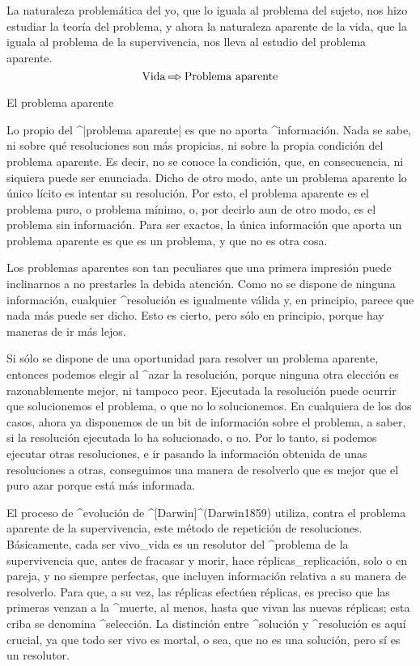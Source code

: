 La naturaleza problemática del yo, que lo iguala al problema del sujeto,
nos hizo estudiar la teoría del problema, y ahora la naturaleza aparente
de la vida, que la iguala al problema de la supervivencia, nos lleva al
estudio del problema aparente.
$$\hbox{Vida} \etapa \hbox{Problema aparente}$$

\kern-12pt

\Section El problema aparente

Lo propio del ^|problema aparente| es que no aporta ^{información}. Nada
se sabe, ni sobre qué resoluciones son más propicias, ni sobre la propia
condición del problema aparente. Es decir, no se conoce la condición,
que, en consecuencia, ni siquiera puede ser enunciada. Dicho de otro
modo, ante un problema aparente lo único lícito es intentar su
resolución. Por esto, el problema aparente es el problema puro, o
problema mínimo, o, por decirlo aun de otro modo, es el problema sin
información. Para ser exactos, la única información que aporta un
problema aparente es que es un problema, y que no es otra cosa.

Los problemas aparentes son tan peculiares que una primera impresión
puede inclinarnos a no prestarles la debida atención. Como no se dispone
de ninguna información, cualquier ^{resolución} es igualmente válida y,
en principio, parece que nada más puede ser dicho. Esto es cierto, pero
sólo en principio, porque hay maneras de ir más lejos.

Si sólo se dispone de una oportunidad para resolver un problema
aparente, entonces podemos elegir al ^{azar} la resolución, porque
ninguna otra elección es razonablemente mejor, ni tampoco peor.
Ejecutada la resolución puede ocurrir que solucionemos el problema, o
que no lo solucionemos. En cualquiera de los dos casos, ahora ya
disponemos de un bit de información sobre el problema, a saber, si la
resolución ejecutada lo ha solucionado, o no. Por lo tanto, si podemos
ejecutar otras resoluciones, e ir pasando la información obtenida de
unas resoluciones a otras, conseguimos una manera de resolverlo que es
mejor que el puro azar porque está más informada.

El proceso de ^{evolución} de ^[Darwin]^(Darwin1859) utiliza, contra el
problema aparente de la supervivencia, este método de repetición de
resoluciones. Básicamente, cada ser vivo_{vida} es un resolutor del
^{problema de la supervivencia} que, antes de fracasar y morir, hace
réplicas_{replicación}, solo o en pareja, y no siempre perfectas, que
incluyen información relativa a su manera de resolverlo. Para que, a su
vez, las réplicas efectúen réplicas, es preciso que las primeras venzan
a la ^{muerte}, al menos, hasta que vivan las nuevas réplicas; esta
criba se denomina ^{selección}. La distinción entre ^{solución} y
^{resolución} es aquí crucial, ya que todo ser vivo es mortal, o sea,
que no es una solución, pero sí es un resolutor.

